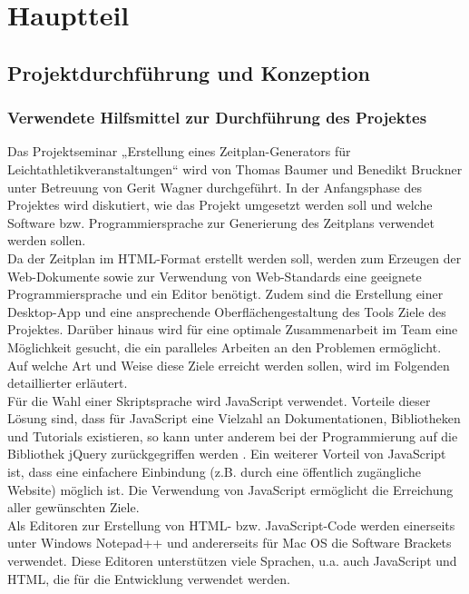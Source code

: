 
\chapter{Hauptteil}
\label{chap:Hauptteil}

\section{Projektdurchführung und Konzeption}

\subsection{Verwendete Hilfsmittel zur Durchführung des Projektes}
Das Projektseminar „Erstellung eines Zeitplan-Generators für Leichtathletikveranstaltungen“ wird von Thomas Baumer und Benedikt Bruckner unter Betreuung von Gerit Wagner durchgeführt. In der Anfangsphase des Projektes wird diskutiert, wie das Projekt umgesetzt werden soll und welche Software bzw. Programmiersprache zur Generierung des Zeitplans verwendet werden sollen.\\
Da der Zeitplan im HTML-Format erstellt werden soll, werden zum Erzeugen der Web-Dokumente sowie zur Verwendung von Web-Standards eine geeignete Programmiersprache und ein Editor benötigt. Zudem sind die Erstellung einer Desktop-App und eine ansprechende Oberflächengestaltung des Tools Ziele des Projektes. Darüber hinaus wird für eine optimale Zusammenarbeit im Team eine Möglichkeit gesucht, die ein paralleles Arbeiten an den Problemen ermöglicht. Auf welche Art und Weise diese Ziele erreicht werden sollen, wird im Folgenden detaillierter erläutert.\\
Für die Wahl einer Skriptsprache wird JavaScript verwendet. Vorteile dieser Lösung sind, dass für JavaScript eine Vielzahl an Dokumentationen, Bibliotheken und Tutorials existieren, so kann unter anderem bei der Programmierung auf die Bibliothek jQuery zurückgegriffen werden \cite{w3schools}. Ein weiterer Vorteil von JavaScript ist, dass eine einfachere Einbindung (z.B. durch eine öffentlich zugängliche Website) möglich ist. Die Verwendung von JavaScript ermöglicht die Erreichung aller gewünschten Ziele.\\
Als Editoren zur Erstellung von HTML- bzw. JavaScript-Code werden einerseits unter Windows Notepad++ und andererseits für Mac OS die Software Brackets verwendet. Diese Editoren unterstützen viele Sprachen, u.a. auch JavaScript und HTML, die für die Entwicklung verwendet werden.\\
